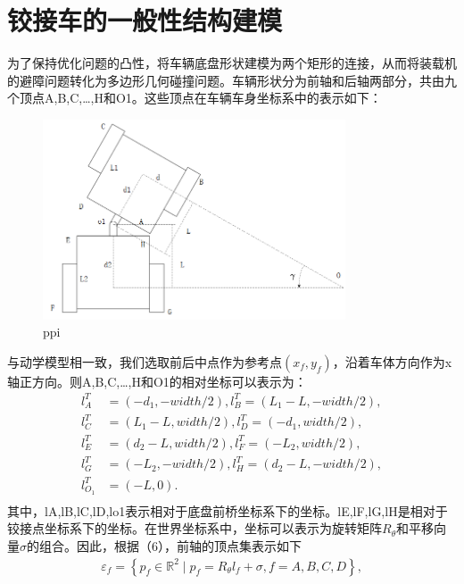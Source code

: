 \documentclass[master,academic]{ysuthesis} %
\begin{document}
	\section{铰接车的一般性结构建模}
	为了保持优化问题的凸性，将车辆底盘形状建模为两个矩形的连接，从而将装载机的避障问题转化为多边形几何碰撞问题。车辆形状分为前轴和后轴两部分，共由九个顶点A,B,C,…,H和O1。这些顶点在车辆车身坐标系中的表示如下：
	\begin{figure}[!ht]
		\centering
		\includegraphics[width=0.8\textwidth]{ppi.png}
		\caption{ppi}
		\label{fig:ppi}
	\end{figure}
	与动学模型相一致，我们选取前后中点作为参考点$(x_f,y_f)$，沿着车体方向作为x轴正方向。则A,B,C,…,H和O1的相对坐标可以表示为：
	\begin{equation}
		\begin{aligned}
			l_{A}^{T}&=( -d_1,-width/2 ) ,l_{B}^{T}=( L_1-L,-width/2 ) ,\\
			l_{C}^{T}&=( L_1-L,width/2 ) ,l_{D}^{T}=( -d_1,width/2 ) ,\\
			l_{E}^{T}&=( d_2-L,width/2 ) ,l_{F}^{T}=( -L_2,width/2 ) ,\\
			l_{G}^{T}&=( -L_2,-width/2 ) ,l_{H}^{T}=( d_2-L,-width/2 ) ,\\
			l_{O_1}^{T}&=( -L,0 ) .\\
		\end{aligned}
	\end{equation}
	其中，lA,lB,lC,lD,lo1表示相对于底盘前桥坐标系下的坐标。lE,lF,lG,lH是相对于铰接点坐标系下的坐标。在世界坐标系中，坐标可以表示为旋转矩阵$R_\theta$和平移向量$\sigma$的组合。因此，根据（6），前轴的顶点集表示如下
	\begin{equation}
	\begin{aligned}
		\varepsilon_f = \left\{ p_f \in \mathbb{R}^2 \mid p_f=R_\theta l_f+\sigma,  f = A,B,C,D \right\},
	\end{aligned} 
	\end{equation}
	
\end{document}
